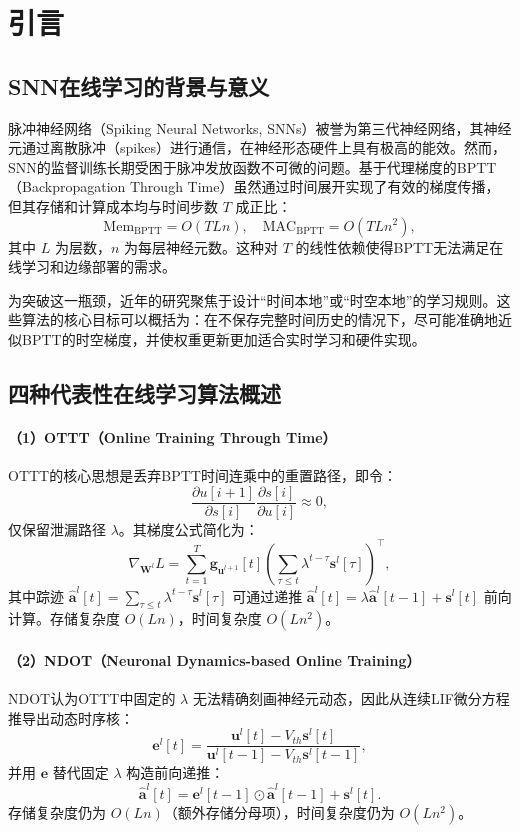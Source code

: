 \documentclass[journal,12pt,onecolumn]{IEEEtran}
\begin{document}
\section{引言}

\subsection{SNN在线学习的背景与意义}

脉冲神经网络（Spiking Neural Networks, SNNs）被誉为第三代神经网络，其神经元通过离散脉冲（spikes）进行通信，在神经形态硬件上具有极高的能效。然而，SNN的监督训练长期受困于脉冲发放函数不可微的问题。基于代理梯度的BPTT（Backpropagation Through Time）虽然通过时间展开实现了有效的梯度传播，但其存储和计算成本均与时间步数 \(T\) 成正比：
\[
\text{Mem}_{\text{BPTT}} = O(TLn), \quad \text{MAC}_{\text{BPTT}} = O(TLn^2),
\]
其中 \(L\) 为层数，\(n\) 为每层神经元数。这种对 \(T\) 的线性依赖使得BPTT无法满足在线学习和边缘部署的需求。

为突破这一瓶颈，近年的研究聚焦于设计“时间本地”或“时空本地”的学习规则。这些算法的核心目标可以概括为：在不保存完整时间历史的情况下，尽可能准确地近似BPTT的时空梯度，并使权重更新更加适合实时学习和硬件实现。

\subsection{四种代表性在线学习算法概述}

\paragraph{（1）OTTT（Online Training Through Time）}
OTTT的核心思想是丢弃BPTT时间连乘中的重置路径，即令：
\[
\frac{\partial u[i+1]}{\partial s[i]}\frac{\partial s[i]}{\partial u[i]} \approx 0,
\]
仅保留泄漏路径 \(\lambda\)。其梯度公式简化为：
\[
\nabla_{\mathbf{W}^l} L = \sum_{t=1}^T \mathbf{g}_{\mathbf{u}^{l+1}}[t] \left( \sum_{\tau \le t} \lambda^{t-\tau} \mathbf{s}^l[\tau] \right)^\top,
\]
其中踪迹 \(\hat{\mathbf{a}}^l[t] = \sum_{\tau \le t} \lambda^{t-\tau} \mathbf{s}^l[\tau]\) 可通过递推 \(\hat{\mathbf{a}}^l[t] = \lambda \hat{\mathbf{a}}^l[t-1] + \mathbf{s}^l[t]\) 前向计算。存储复杂度 \(O(Ln)\)，时间复杂度 \(O(Ln^2)\)。

\paragraph{（2）NDOT（Neuronal Dynamics-based Online Training）}
NDOT认为OTTT中固定的 \(\lambda\) 无法精确刻画神经元动态，因此从连续LIF微分方程推导出动态时序核：
\[
\mathbf{e}^l[t] = \frac{\mathbf{u}^l[t] - V_{th}\mathbf{s}^l[t]}{\mathbf{u}^l[t-1] - V_{th}\mathbf{s}^l[t-1]},
\]
并用 \(\mathbf{e}\) 替代固定 \(\lambda\) 构造前向递推：
\[
\hat{\mathbf{a}}^l[t] = \mathbf{e}^l[t-1] \odot \hat{\mathbf{a}}^l[t-1] + \mathbf{s}^l[t].
\]
存储复杂度仍为 \(O(Ln)\)（额外存储分母项），时间复杂度仍为 \(O(Ln^2)\)。
\end{document}
